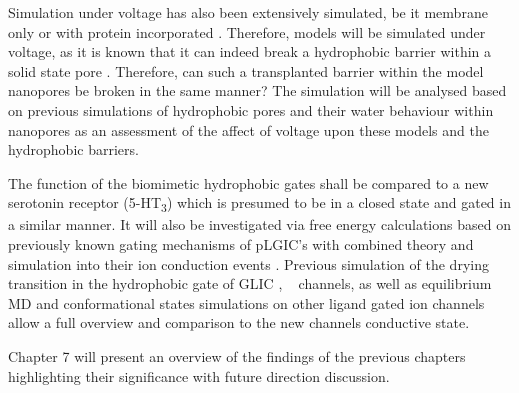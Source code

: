 Simulation under voltage has also been extensively simulated, be it membrane only \cite{Tarek2005,Bockmann2008,Delemotte2012,Polak2013} or with protein incorporated \cite{Suenaga1998,Siu2007,Wells2007,Roux2008}. Therefore, models will be simulated under voltage, as it is known that it can indeed break a hydrophobic barrier within a solid state pore \cite{Powell2011}. Therefore, can such a transplanted barrier within the model nanopores be broken in the same manner? The simulation will be analysed based on previous simulations of hydrophobic pores and their water behaviour \cite{Ho2013,Tokman2013} within nanopores \cite{Vaitheeswaran2004f,Dzubiella2004d,Dzubiella2005,Bratko2007,Vanzo2015x} as an assessment of the affect of voltage upon these models and the hydrophobic barriers. 

The function of the biomimetic hydrophobic gates shall be compared to a new serotonin receptor (5-HT\textsubscript{3}) which is presumed to be in a closed state and gated in a similar manner. It will also be investigated via free energy calculations based on previously known gating mechanisms of pLGIC's \cite{Calimet2013} with combined theory and simulation into their ion conduction events \cite{Cheng2010,Zhu2012a}. Previous simulation of the drying transition in the hydrophobic gate of GLIC \cite{Zhu2012}, \na\ \cite{Beckstein2006b} channels, as well as equilibrium MD \cite{Murail2011a,Murail2012} and conformational states simulations \cite{Yoluk2013,Yoluk2015} on other ligand gated ion channels allow a full overview and comparison to the new channels conductive state.

Chapter 7 will present an overview of the findings of the previous chapters highlighting their significance with future direction discussion. 
